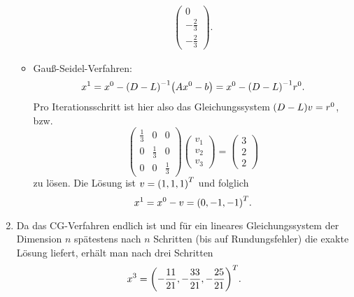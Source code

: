 \documentclass{exercise}
\begin{document}
\begin{enumerate}
\begin{itemize}
\begin{align*}
\begin{pmatrix}
                    0\\
                    -\frac{2}{3}\\
                    -\frac{2}{3}
                \end{pmatrix}.
            \end{align*}
            \item Gauß-Seidel-Verfahren:
            \[
                x^1 = x^0 - \parentheses*{D - L}^{-1}\parentheses*{Ax^0 - b} = x^0 - \parentheses*{D - L}^{-1}r^0.
            \]
            Pro Iterationsschritt ist hier also das Gleichungssystem \(\parentheses*{D - L}v = r^0\), bzw.
            \[
                \begin{pmatrix}
                    \frac{1}{3} & 0 & 0\\
                    0 & \frac{1}{3} & 0\\
                    0 & 0 & \frac{1}{3}
                \end{pmatrix}\begin{pmatrix}
                    v_1\\
                    v_2\\
                    v_3
                \end{pmatrix} = \begin{pmatrix}
                    3\\
                    2\\
                    2
                \end{pmatrix}
            \]
            zu lösen.
            Die Lösung ist \(v = \parentheses*{1, 1, 1}^T\) und folglich
            \[
                x^1 = x^0 - v = \parentheses*{0, -1, -1}^T.
            \]
        \end{itemize}
        \item Da das CG-Verfahren endlich ist und für ein lineares Gleichungssystem der Dimension \(n\) spätestens nach \(n\) Schritten (bis auf Rundungsfehler) die exakte Lösung liefert, erhält man nach drei Schritten
        \[
            x^3 = \parentheses*{-\frac{11}{21}, -\frac{33}{21}, -\frac{25}{21}}^T.
        \]
    \end{enumerate}
\end{document}
